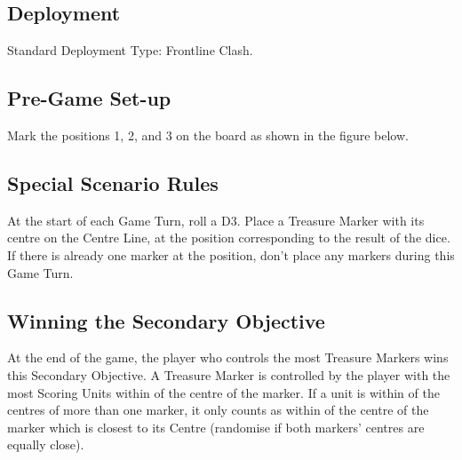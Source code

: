 
\label{HiddenTreasures}


\subsection*{Deployment}

Standard Deployment Type: Frontline Clash.

\subsection*{Pre-Game Set-up}

Mark the positions 1, 2, and 3 on the board as shown in the figure below.


\subsection*{Special Scenario Rules}

At the start of each Game Turn, roll a D3. Place a Treasure Marker with its centre on the Centre Line, at the position corresponding to the result of the dice. If there is already one marker at the position, don't place any markers during this Game Turn.

\subsection*{Winning the Secondary Objective}

At the end of the game, the player who controls the most Treasure Markers wins this Secondary Objective. A Treasure Marker is controlled by the player with the most Scoring Units within  of the centre of the marker. If a unit is within  of the centres of more than one marker, it only counts as within  of the centre of the marker which is closest to its Centre (randomise if both markers' centres are equally close).
